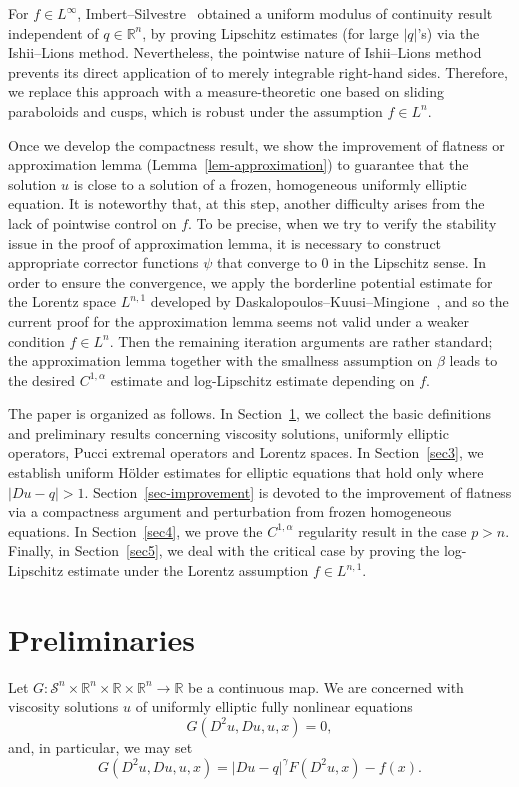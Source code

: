 \documentclass[11pt]{amsart}
\theoremstyle{plain}
\theoremstyle{definition}
\numberwithin{equation}{section}
\begin{document}
For $f\in L^{\infty}$, Imbert--Silvestre~\cite{IS13} obtained a uniform modulus of continuity result independent of $q \in \mathbb{R}^n$, by proving Lipschitz estimates (for large $|q|$'s) via the Ishii--Lions method. Nevertheless, the pointwise nature of Ishii--Lions method prevents its direct application of to merely integrable right-hand sides. Therefore, we replace this approach with a measure-theoretic one based on sliding paraboloids and cusps, which is robust under the assumption $f\in L^n$.

Once we develop the compactness result, we show the improvement of flatness or approximation lemma (Lemma~\ref{lem-approximation}) to guarantee that the solution $u$ is close to a solution of a frozen, homogeneous uniformly elliptic equation. It is noteworthy that, at this step, another difficulty arises from the lack of pointwise control on $f$. To be precise, when we try to verify the stability issue in the proof of approximation lemma, it is necessary to construct appropriate corrector functions $\psi$ that converge to $0$ in the Lipschitz sense. In order to ensure the convergence, we apply the borderline potential estimate for the Lorentz space $L^{n,1}$ developed by Daskalopoulos--Kuusi--Mingione~\cite{DKM14}, and so the current proof for the approximation lemma seems not valid under a weaker condition $f \in L^n$. Then the remaining iteration arguments are rather standard; the approximation lemma together with the smallness assumption on $\beta$ leads to the desired $C^{1, \alpha}$ estimate and log-Lipschitz estimate depending on $f$.\newline

The paper is organized as follows. In Section~\ref{sec-preliminaries}, we collect the basic definitions and preliminary results concerning viscosity solutions, uniformly elliptic operators, Pucci extremal operators and Lorentz spaces. In Section~\ref{sec3}, we establish uniform H\"older estimates for elliptic equations that hold only where $|Du-q|>1$. Section~\ref{sec-improvement} is devoted to the improvement of flatness via a compactness argument and perturbation from frozen homogeneous equations. In Section~\ref{sec4}, we prove the $C^{1,\alpha}$ regularity result in the case $p>n$. Finally, in Section~\ref{sec5}, we deal with the critical case by proving the log-Lipschitz estimate under the Lorentz assumption $f \in L^{n, 1}$.

\section{Preliminaries}\label{sec-preliminaries}
Let $G: \mathcal{S}^n \times \mathbb{R}^n \times \mathbb{R} \times \mathbb{R}^n \to \mathbb{R}$ be a continuous map. We are concerned with viscosity solutions $u$ of uniformly elliptic fully nonlinear equations
\begin{equation}\label{eq-general}
    G(D^2u, Du, u, x)=0,
\end{equation}
and, in particular, we may set
\begin{equation*}
    G(D^2u, Du, u, x) = |Du-q|^{\gamma}F(D^2u, x)-f(x).
\end{equation*}
\end{document}
